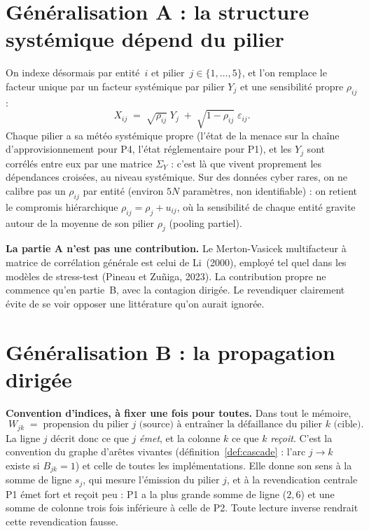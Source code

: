 
\section{Généralisation A : la structure systémique dépend du pilier}

On indexe désormais par entité~$i$ et pilier~$j\in\{1,\dots,5\}$, et l'on remplace le facteur
unique par un facteur systémique par pilier $Y_j$ et une sensibilité propre
$\rho_{ij}$ :
\begin{equation}
X_{ij} \;=\; \sqrt{\rho_{ij}}\;Y_j \;+\; \sqrt{1-\rho_{ij}}\;\varepsilon_{ij}.
\end{equation}
Chaque pilier a sa \og météo systémique\fg{} propre (l'état de la menace sur la chaîne
d'approvisionnement pour P4, l'état réglementaire pour P1), et les $Y_j$ sont corrélés entre eux
par une matrice $\Sigma_Y$ : c'est là que vivent proprement les dépendances croisées, au niveau
systémique. Sur des données cyber rares, on ne calibre pas un $\rho_{ij}$ par entité (environ
$5N$ paramètres, non identifiable) : on retient le compromis hiérarchique
$\rho_{ij}=\rho_j+u_{ij}$, où la sensibilité de chaque entité gravite autour de la moyenne de
son pilier $\rho_j$ (pooling partiel).

\begin{cle}
\textbf{La partie A n'est pas une contribution.} Le Merton-Vasicek multifacteur à
matrice de corrélation générale est celui de Li~(2000), employé tel quel dans les modèles de
stress-test (Pineau et Zuñiga, 2023). La contribution propre ne commence qu'en partie~B, avec
la contagion dirigée. Le revendiquer clairement évite de se voir opposer une
littérature qu'on aurait ignorée.
\end{cle}

\section{Généralisation B : la propagation dirigée}

\begin{cle}
\textbf{Convention d'indices, à fixer une fois pour toutes.} Dans tout le mémoire,
\[
  \boxed{\;W_{jk}\;=\;\text{propension du pilier } j \text{ (source) à entraîner la
  défaillance du pilier } k \text{ (cible).}\;}
\]
La ligne $j$ décrit donc ce que $j$ \emph{émet}, et la colonne $k$ ce que $k$
\emph{reçoit}. C'est la convention du graphe d'arêtes vivantes (définition~\ref{def:cascade} :
l'arc $j\to k$ existe si $B_{jk}=1$) et celle de toutes les implémentations. Elle donne son sens
à la somme de ligne $s_j$, qui mesure l'émission du pilier $j$, et à la revendication
centrale \og{}P1 émet fort et reçoit peu\fg{} : P1 a la plus grande somme de ligne ($2{,}6$) et
une somme de colonne trois fois inférieure à celle de P2. Toute lecture inverse rendrait cette
revendication fausse.
\end{cle}

